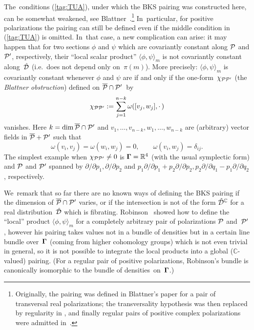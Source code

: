 \documentclass[11pt]{amsart}
\numberwithin{equation}{section}
\theoremstyle{remark}
\newcommand\spr[2]{\langle #1,#2\rangle}
\newcommand\Omg{{\bigam}}   %
\newcommand\PP{{\Cal P}}
\newcommand\DD{{\Cal D}}
\newcommand\GG{{\PP'}}
\newcommand\hatDD{{\hat\DD}}
\newcommand\RR{\mathbb R}
\newcommand{\CC}{\C}
\newcommand{\bigam}{\mbox{\boldmath $\Gamma$}}
\newcommand{\C}{\mathbb C}
\begin{document}
The~conditions (\ref{tag:TUA}), under which the BKS pairing was constructed
here, can be somewhat weakened, see
Blattner~\cite{bib:BlattLN}.\footnote{Originally, the pairing was defined in
Blattner's paper \cite{bib:BlattPSPM} for a pair of transversal real
polarizations; the transversality hypothesis was then replaced by regularity in
\cite{bib:BlattGSPM}, and finally regular pairs of positive complex
polarizations were admitted in~\cite{bib:BlattLN}.} In~particular, for positive
polarizations the pairing can still be defined even if the middle condition
in (\ref{tag:TUA}) is omitted. In~that case, a new complication can arise: it
may happen that for two sections $\phi$ and $\psi$ which are covariantly
constant along $\PP$ and $\GG$, respectively, their ``local scalar product''
$\spr\phi\psi_m$ is not covariantly constant along~$\hatDD$ (i.e.~does not
depend only on~$\pi(m)$). More precisely: $\spr\phi\psi_m$ is covariantly
constant whenever $\phi$ and $\psi$ are if and only if the
one-form~$\chi_{\PP\GG}$ (the {\sl Blattner obstruction\/})
defined on $\overline\PP\cap\GG$~by
\begin{equation}  \chi_{\PP\GG} := \sum_{j=1}^{n-k} \omega([v_j,w_j],\cdot\,)
\label{tag:BLOB}  \end{equation}
vanishes. Here $k=\dim\overline\PP\cap\GG$ and $v_1,\dots,v_{n-k},w_1,\dots,
w_{n-k}$ are (arbitrary) vector fields in $\overline\PP+\GG$ such that
$$ \omega(v_i,v_j)=\omega(w_i,w_j)=0, \qquad \omega(v_i,w_j)=\delta_{ij}.  $$
The simplest example when $\chi_{\PP\GG}\neq0$ is $\Omg=\RR^4$ (with the usual
symplectic form) and $\PP$ and $\GG$ spanned by $\partial/\partial p_1,
\partial/\partial p_2$ and $p_1\partial/\partial p_1+p_2 \partial/\partial p_2,
p_2 \partial/\partial q_1-p_1 \partial/\partial q_2$, respectively.

We~remark that so far there are no known ways of defining the BKS pairing if
the dimension of $\overline\PP\cap\GG$ varies, or if the intersection is not of
the form $\hatDD^\CC$ for a real distribution~$\hatDD$ which is fibrating.
Robinson~\cite{bib:RobiTAMS} showed how to define the ``local'' product
$\spr\phi\psi_m$ for a completely arbitrary pair of polarizations $\PP$
and~$\GG$, however his pairing takes values not in a bundle of densities but in
a certain line bundle over~$\Omg$ (coming from higher cohomology groups) which
is not even trivial in general, so it is not possible to integrate the local
products into a global (\hbox{$\CC$-valued}) pairing. (For a regular pair of
positive polarizations, Robinson's bundle is canonically isomorphic to the
bundle of densities~on~$\Omg$.)
\end{document}
